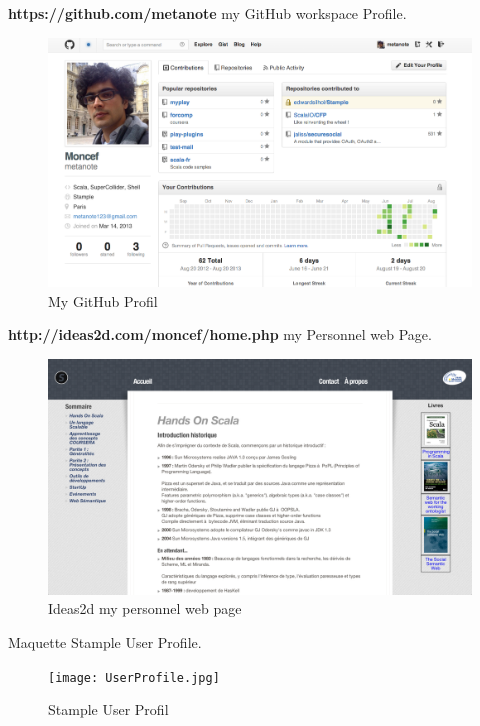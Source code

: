 \newpage
\textbf{https://github.com/metanote} my GitHub workspace Profile.
\begin{figure}[H]
        \centering
                \centering
                \includegraphics[width=\textwidth]{gitProfile.png}
               \caption{My GitHub Profil}

\end{figure}
\textbf{http://ideas2d.com/moncef/home.php} my Personnel web Page.
\begin{figure}[H]
        \centering
                \centering
                \includegraphics[width=\textwidth]{idea2d.png}
               \caption{Ideas2d my personnel web page}

\end{figure}
\newpage
Maquette Stample User Profile.
\begin{figure}[H]
        \centering
                \centering
                \texttt{[image: UserProfile.jpg]}
               \caption{Stample User Profil}

\end{figure}